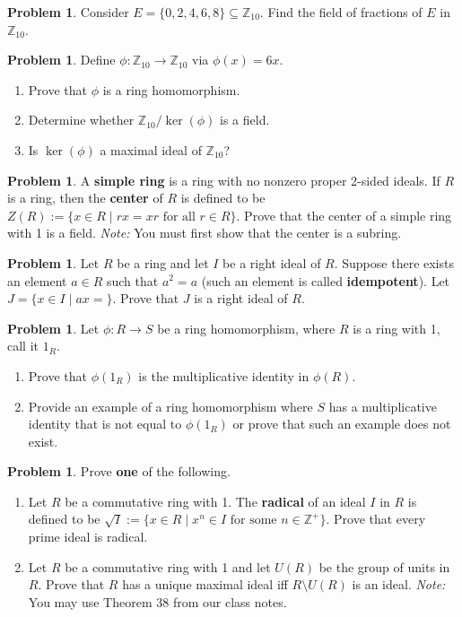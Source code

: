\documentclass[11pt]{scrartcl}
\theoremstyle{definition}
\newtheorem{problem}[theorem]{Problem}
\begin{document}
\begin{problem}
Consider $E=\{0,2,4,6,8\}\subseteq \mathbb{Z}_{10}$.  Find the field of fractions of $E$ in $\mathbb{Z}_{10}$.
\end{problem}

\begin{problem}
Define $\phi:\mathbb{Z}_{10}\to \mathbb{Z}_{10}$ via $\phi(x)=6x$. 
\begin{enumerate}[label=\rm{(\alph*)}]
\item Prove that $\phi$ is a ring homomorphism.
\item Determine whether $\mathbb{Z}_{10}/\ker(\phi)$ is a field.
\item Is $\ker(\phi)$ a maximal ideal of $\mathbb{Z}_{10}$?
\end{enumerate}
\end{problem}

\begin{problem}
A \textbf{simple ring} is a ring with no nonzero proper 2-sided ideals.  If $R$ is a ring, then the \textbf{center} of $R$ is defined to be $Z(R):=\{x\in R\mid rx=xr\text{ for all } r\in R\}$.  Prove that the center of a simple ring with 1 is a field.  \emph{Note:} You must first show that the center is a subring.
\end{problem}

\begin{problem}
Let $R$ be a ring and let $I$ be a right ideal of $R$.  Suppose there exists an element $a\in R$ such that $a^2=a$ (such an element is called \textbf{idempotent}). Let $J=\{x\in I\mid ax=\}$. Prove that $J$ is a right ideal of $R$.
\end{problem}

\begin{problem}
Let $\phi:R\to S$ be a ring homomorphism, where $R$ is a ring with 1, call it $1_R$.
\begin{enumerate}[label=\rm{(\alph*)}]
\item Prove that $\phi(1_R)$ is the multiplicative identity in $\phi(R)$.
\item Provide an example of a ring homomorphism where $S$ has a multiplicative identity that is not equal to $\phi(1_R)$ or prove that such an example does not exist.
\end{enumerate}
\end{problem}

\begin{problem}
Prove \textbf{one} of the following.
\begin{enumerate}[label=\rm{(\alph*)}]
\item Let $R$ be a commutative ring with 1.  The \textbf{radical} of an ideal $I$ in $R$ is defined to be $\sqrt{I}:=\{x\in R\mid x^n\in I\text{ for some }n\in\mathbb{Z}^+\}$. Prove that every prime ideal is radical.
\item Let $R$ be a commutative ring with 1 and let $U(R)$ be the group of units in $R$.  Prove that $R$ has a unique maximal ideal iff $R\setminus U(R)$ is an ideal.  \emph{Note:} You may use Theorem 38 from our class notes.
\end{enumerate}
\end{problem}
\end{document}
